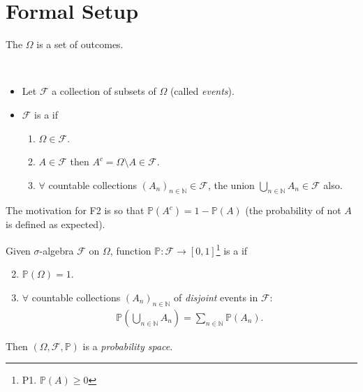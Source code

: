 \section{Formal Setup}

\begin{definition}
    The  $\Omega$ is a set of outcomes.
\end{definition} 

\begin{definition} ~\vspace*{-1.5\baselineskip}
    \begin{itemize}
        \item Let $\mathcal{F}$ a collection of subsets of $\Omega$ (called \emph{events}).
        \item $\mathcal{F}$ is a  if
        \begin{enumerate}[label=F\arabic*.]
            \item $\Omega\in \mathcal{F}$.
            \item $A\in\mathcal F$ then $A^c = \Omega \setminus A \in\mathcal F$.
            \item $\forall$ countable collections $(A_n)_{n\in\mathbb{N}}\in\mathcal F$, the union $\bigcup_{n\in\mathbb{N}} A_n \in \mathcal F$ also.
        \end{enumerate}
    \end{itemize} 
\end{definition}

\begin{remark}
    The motivation for F2 is so that $\mathbb{P}(A^c) = 1 - \mathbb{P}(A)$ (the probability of not $A$ is defined as expected).
\end{remark} 

\begin{definition}
    Given $\sigma$-algebra $\mathcal{F}$ on $\Omega$, function $\mathbb{P}:\mathcal F \to [0,1]$\footnote{P1. $\mathbb{P}(A) \geq 0$} is a  if
    \begin{enumerate}[label=P\arabic*.] \setcounter{enumi}{1}
        \item $\mathbb{P}(\Omega)=1$.
        \item $\forall$ countable collections $(A_n)_{n \in \mathbb{N}}$ of \emph{disjoint} events in $\mathcal{F}$:
        \begin{align*}
            \mathbb{P}\left( \bigcup_{n\in\mathbb{N}} A_n \right) = \sum_{n\in\mathbb{N}}\mathbb{P}(A_n).
        \end{align*}
    \end{enumerate} 
    Then $(\Omega, \mathcal F,\mathbb{P})$ is a \emph{probability space}.
\end{definition} 

